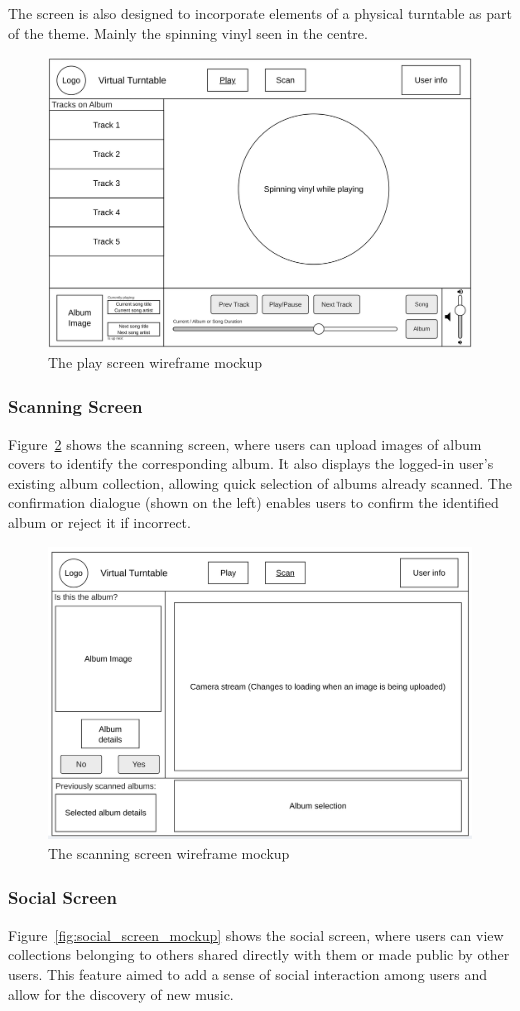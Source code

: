 The screen is also designed to incorporate elements of a physical turntable as part of the theme. Mainly the spinning vinyl seen in the centre.
\begin{figure} [H]
    \centering
    \includegraphics[width=0.6\linewidth]{figures/play_screen_mockup.png}
    \caption{The play screen wireframe mockup}
    \label{fig:play_screen_mockup}
\end{figure}

\subsubsection{Scanning Screen}
Figure~\ref{fig:scan_screen_mockup} shows the scanning screen, where users can upload images of album covers to identify the corresponding album. It also displays the logged-in user’s existing album collection, allowing quick selection of albums already scanned. The confirmation dialogue (shown on the left) enables users to confirm the identified album or reject it if incorrect.

\begin{figure} [H]
    \centering
    \includegraphics[width=0.6\linewidth]{figures/scan_screen_mockup.png}
    \caption{The scanning screen wireframe mockup}
    \label{fig:scan_screen_mockup}
\end{figure}


\subsubsection{Social Screen}
Figure~\ref{fig:social_screen_mockup} shows the social screen, where users can view collections belonging to others shared directly with them or made public by other users. This feature aimed to add a sense of social interaction among users and allow for the discovery of new music.

